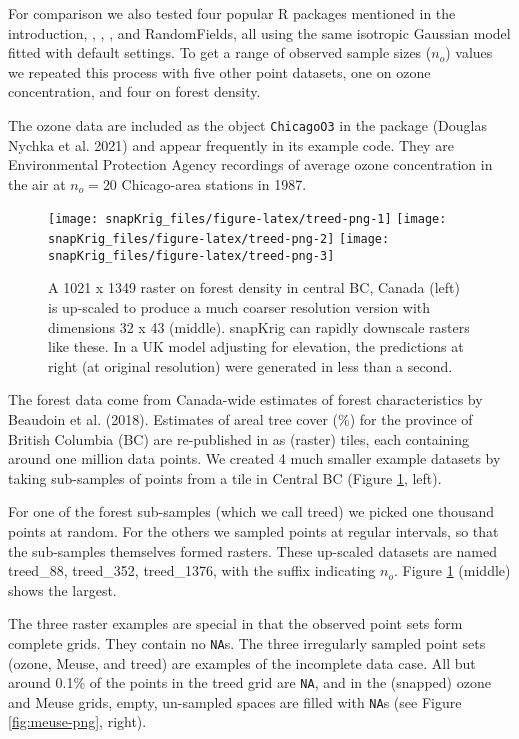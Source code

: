 For comparison we also tested four popular R packages mentioned in the introduction, , , , and RandomFields, all using the same isotropic Gaussian model fitted with default settings. To get a range of observed sample sizes (\(n_o\)) values we repeated this process with five other point datasets, one on ozone concentration, and four on forest density.

The ozone data are included as the object \texttt{ChicagoO3} in the  package (Douglas Nychka et al. 2021) and appear frequently in its example code. They are Environmental Protection Agency recordings of average ozone concentration in the air at \(n_o=20\) Chicago-area stations in 1987.

\begin{figure}[htb]
\texttt{[image: snapKrig\_files/figure-latex/treed-png-1]} \texttt{[image: snapKrig\_files/figure-latex/treed-png-2]} \texttt{[image: snapKrig\_files/figure-latex/treed-png-3]} \caption{A 1021 x 1349 raster on forest density in central BC, Canada (left) is up-scaled to produce a much coarser resolution version with dimensions 32 x 43 (middle). snapKrig can rapidly downscale rasters like these. In a UK model adjusting for elevation, the predictions at right (at original resolution) were generated in less than a second.}\label{fig:treed-png}
\end{figure}

The forest data come from Canada-wide estimates of forest characteristics by Beaudoin et al. (2018). Estimates of areal tree cover (\%) for the province of British Columbia (BC) are re-published in  as (raster) tiles, each containing around one million data points. We created 4 much smaller example datasets by taking sub-samples of points from a tile in Central BC (Figure \ref{fig:treed-png}, left).

For one of the forest sub-samples (which we call treed) we picked one thousand points at random. For the others we sampled points at regular intervals, so that the sub-samples themselves formed rasters. These up-scaled datasets are named treed\_88, treed\_352, treed\_1376, with the suffix indicating \(n_o\). Figure \ref{fig:treed-png} (middle) shows the largest.

The three raster examples are special in that the observed point sets form complete grids. They contain no \texttt{NA}s. The three irregularly sampled point sets (ozone, Meuse, and treed) are examples of the incomplete data case. All but around 0.1\% of the points in the treed grid are \texttt{NA}, and in the (snapped) ozone and Meuse grids, empty, un-sampled spaces are filled with \texttt{NA}s (see Figure \ref{fig:meuse-png}, right).

